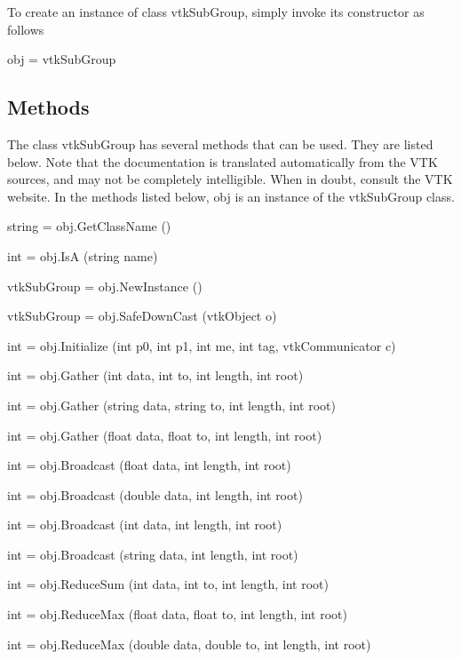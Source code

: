 To create an instance of class vtk\-Sub\-Group, simply invoke its constructor as follows \begin{DoxyVerb}  obj = vtkSubGroup
\end{DoxyVerb}
 \hypertarget{vtkwidgets_vtkxyplotwidget_Methods}{}\subsection{Methods}\label{vtkwidgets_vtkxyplotwidget_Methods}
The class vtk\-Sub\-Group has several methods that can be used. They are listed below. Note that the documentation is translated automatically from the V\-T\-K sources, and may not be completely intelligible. When in doubt, consult the V\-T\-K website. In the methods listed below, {\ttfamily obj} is an instance of the vtk\-Sub\-Group class. 
\begin{DoxyItemize}
\item {\ttfamily string = obj.\-Get\-Class\-Name ()}  
\item {\ttfamily int = obj.\-Is\-A (string name)}  
\item {\ttfamily vtk\-Sub\-Group = obj.\-New\-Instance ()}  
\item {\ttfamily vtk\-Sub\-Group = obj.\-Safe\-Down\-Cast (vtk\-Object o)}  
\item {\ttfamily int = obj.\-Initialize (int p0, int p1, int me, int tag, vtk\-Communicator c)}  
\item {\ttfamily int = obj.\-Gather (int data, int to, int length, int root)}  
\item {\ttfamily int = obj.\-Gather (string data, string to, int length, int root)}  
\item {\ttfamily int = obj.\-Gather (float data, float to, int length, int root)}  
\item {\ttfamily int = obj.\-Broadcast (float data, int length, int root)}  
\item {\ttfamily int = obj.\-Broadcast (double data, int length, int root)}  
\item {\ttfamily int = obj.\-Broadcast (int data, int length, int root)}  
\item {\ttfamily int = obj.\-Broadcast (string data, int length, int root)}  
\item {\ttfamily int = obj.\-Reduce\-Sum (int data, int to, int length, int root)}  
\item {\ttfamily int = obj.\-Reduce\-Max (float data, float to, int length, int root)}  
\item {\ttfamily int = obj.\-Reduce\-Max (double data, double to, int length, int root)}  

\end{DoxyItemize}
